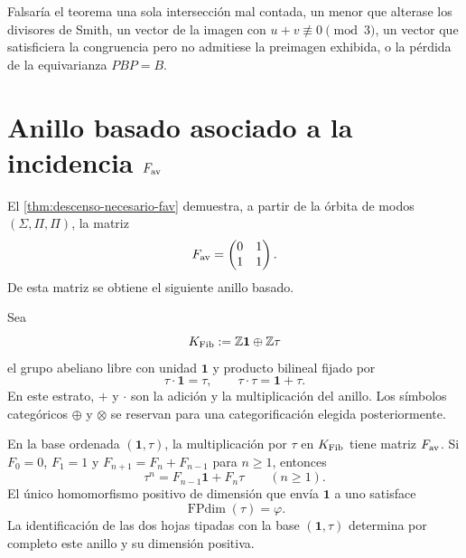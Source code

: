 \begin{criterion}
\label{crit:incidencia-residuo-soporte}
Falsaría el teorema una sola intersección mal contada, un menor que alterase
los divisores de Smith, un vector de la imagen con \(u+v\not\equiv0\pmod3\),
un vector que satisficiera la congruencia pero no admitiese la preimagen
exhibida, o la pérdida de la equivarianza \(PBP=B\).
\end{criterion}

\section[Anillo basado de Fibonacci]{Anillo basado asociado a la incidencia
  \texorpdfstring{\(F_{\rm av}\)}{F\_av}}
\label{sec:anillo-basado-fibonacci}

El \cref{thm:descenso-necesario-fav} demuestra, a partir de la órbita de
modos \((\Sigma,\Pi,\Pi)\), la matriz
\[
 F_{\rm av}=
 \begin{pmatrix}0&1\\1&1\end{pmatrix}.
\]
De esta matriz se obtiene el siguiente anillo basado.

\begin{definition}
\label{def:anillo-basado-fibonacci}
Sea
\[
 K_{\rm Fib}:=\mathbb Z\mathbf 1\oplus\mathbb Z\tau
\]
el grupo abeliano libre con unidad \(\mathbf 1\) y producto bilineal fijado por
\[
 \tau\cdot\mathbf 1=\tau,\qquad
 \tau\cdot\tau=\mathbf 1+\tau.
\]
En este estrato, \(+\) y \(\cdot\) son la adición y la multiplicación del
anillo. Los símbolos categóricos \(\oplus\) y \(\otimes\) se reservan para
una categorificación elegida posteriormente.
\end{definition}

\begin{theorem}
\label{thm:anillo-fibonacci-fav}
En la base ordenada \((\mathbf 1,\tau)\), la multiplicación por \(\tau\) en
\(K_{\rm Fib}\) tiene matriz \(F_{\rm av}\). Si
\(F_0=0\), \(F_1=1\) y
\(F_{n+1}=F_n+F_{n-1}\) para \(n\geq1\), entonces
\[
 \tau^n=F_{n-1}\mathbf 1+F_n\tau
 \qquad(n\geq1).
\]
El único homomorfismo positivo de dimensión que envía
\(\mathbf 1\) a uno satisface
\[
 \operatorname{FPdim}(\tau)=\varphi.
\]
La identificación de las dos hojas tipadas con la base
\((\mathbf 1,\tau)\) determina por completo este anillo y su dimensión
positiva.
\end{theorem}

